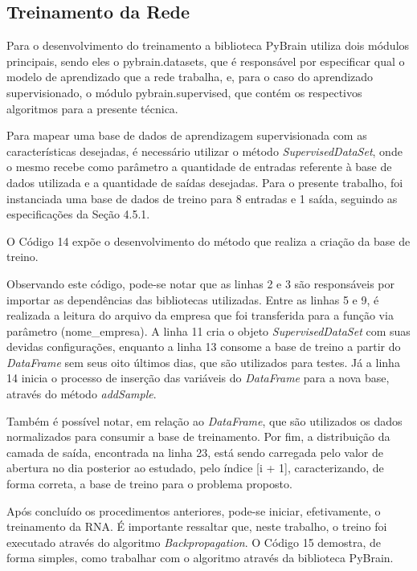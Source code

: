 \subsection{Treinamento da Rede}
Para o desenvolvimento do treinamento a biblioteca PyBrain utiliza dois módulos principais, sendo eles o pybrain.datasets, que é responsável por especificar qual o modelo de aprendizado que a rede trabalha, e, para o caso do aprendizado supervisionado, o módulo pybrain.supervised, que contém os respectivos algoritmos para a presente técnica.

Para mapear uma base de dados de aprendizagem supervisionada com as características desejadas, é necessário utilizar o método \textit{SupervisedDataSet}, onde o mesmo recebe como parâmetro a quantidade de entradas referente à base de dados utilizada e a quantidade de saídas desejadas. Para o presente trabalho, foi instanciada uma base de dados de treino para 8 entradas e 1 saída, seguindo as especificações da Seção 4.5.1.

O Código 14 expõe o desenvolvimento do método que realiza a criação da base de treino.



Observando este código, pode-se notar que as linhas 2 e 3 são responsáveis por importar as dependências das bibliotecas utilizadas. Entre as linhas 5 e 9, é realizada a leitura do arquivo da empresa que foi transferida para a função via parâmetro (nome\_empresa). A linha 11 cria o objeto \textit{SupervisedDataSet} com suas devidas configurações, enquanto a linha 13 consome a base de treino a partir do \textit{DataFrame} sem seus oito últimos dias, que são utilizados para testes. Já a linha 14 inicia o processo de inserção das variáveis do \textit{DataFrame} para a nova base, através do método \textit{addSample}.

Também é possível notar, em relação ao \textit{DataFrame}, que são utilizados os dados normalizados para consumir a base de treinamento. Por fim, a distribuição da camada de saída, encontrada na linha 23, está sendo carregada pelo valor de abertura no dia posterior ao estudado, pelo índice [i + 1], caracterizando, de forma correta, a base de treino para o problema proposto.

Após concluído os procedimentos anteriores, pode-se iniciar, efetivamente, o treinamento da RNA. É importante ressaltar que, neste trabalho, o treino foi executado através do algoritmo \textit{Backpropagation}. O Código 15 demostra, de forma simples, como trabalhar com o algoritmo através da biblioteca PyBrain.

